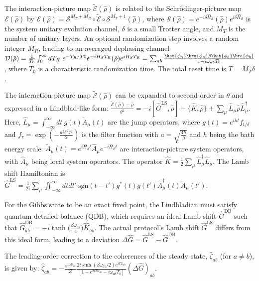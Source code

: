 \documentclass[10pt]{article}
\begin{document}
The interaction-picture map $\tilde{\mathcal{E}}(\hat\rho)$ is related to the Schrödinger-picture map $\mathcal{E}(\hat\rho)$ by $\mathcal{E}(\hat\rho) = \mathcal{S}^{M_T+M_R} \circ\tilde{\mathcal{E}}\circ\mathcal{S}^{M_T+1}(\hat\rho)$, where $\mathcal{S}(\hat\rho) = e^{-i\delta \hat H_S}(\hat\rho)e^{i\delta \hat H_S}$ is the system unitary evolution channel, $\delta$ is a small Trotter angle, and $M_T$ is the number of unitary layers. An optional randomization step involves a random integer $M_R$, leading to an averaged dephasing channel $\mathcal{D}(\hat\rho) = \frac{1}{T_0} \int_0^\infty dT_R\ e^{-T_R/T0} e^{-i\hat H_ST_R} (\hat\rho) e^{i\hat H_ST_R} = \sum_{ab} \frac{\ket{\phi_a}\bra{\phi_a}\hat\rho\ket{\phi_b}\bra{\phi_b} }{1-i\omega_{ab}T_0}$, where $T_0$ is a characteristic randomization time. The total reset time is $T = M_T\delta$.

The interaction-picture map $\tilde{\mathcal{E}}(\hat\rho)$ can be expanded to second order in $\theta$ and expressed in a Lindblad-like form:
$\frac{\tilde{\mathcal{E}}(\hat\rho)-\hat{\rho}}{\theta^2} = -i[\hat G^{\text{LS}}, \hat\rho]+ \{\hat K,\hat\rho\}+\sum_\mu \hat L_\mu \hat\rho\hat L_\mu^\dagger$.
Here, $\hat L_\mu = \int_{-\infty}^\infty dt\ g(t) \tilde A_\mu(t)$ are the jump operators, where $g(t) = e^{iht} f_{t/\delta}$ and $f_\tau = \exp(-\frac{a^2\delta^2\tau^2}{2})$ is the filter function with $a = \sqrt{\frac{4 h}{\beta}}$ and $h$ being the bath energy scale. $\tilde A_\mu(t) = e^{i\hat H_S t}\hat A_\mu e^{-i\hat H_S t}$ are interaction-picture system operators, with $\hat A_\mu$ being local system operators. The operator $\hat K = \frac{1}{2}\sum_\mu \hat L^\dagger_\mu\hat L_\mu$. The Lamb shift Hamiltonian is $\hat G^{\text{LS}} = \frac{1}{2i}\sum_\mu \iint_{-\infty}^\infty dtdt'\ \text{sgn}(t-t')g^*(t)g(t') \tilde A^\dagger_{\mu}(t)\tilde A_{\mu}(t')$.

For the Gibbs state to be an exact fixed point, the Lindbladian must satisfy quantum detailed balance (QDB), which requires an ideal Lamb shift $\hat G^{\text{DB}}$ such that $\hat G^{\text{DB}}_{ab} = -i\tanh \bigg(\frac{\beta\omega_{ab}}{4}\bigg)\hat K_{ab}$. The actual protocol's Lamb shift $\hat G^{\text{LS}}$ differs from this ideal form, leading to a deviation $\Delta \hat G = \hat G^{\text{LS}}-\hat G^{\text{DB}}$.

The leading-order correction to the coherences of the steady state, $\hat\zeta_{ab}$ (for $a \neq b$), is given by:
$\hat\zeta_{ab} = -\frac{e^{-\beta\bar{\epsilon}_{ab}} }{Z}\frac{2i\sinh(\beta\omega_{ab}/2)e^{iT\omega_{ab}}} {[1 - e^{2iT\omega_{ab}}-i\omega_{ab}T_0]}(\Delta \hat G)_{ab}$.
\end{document}
